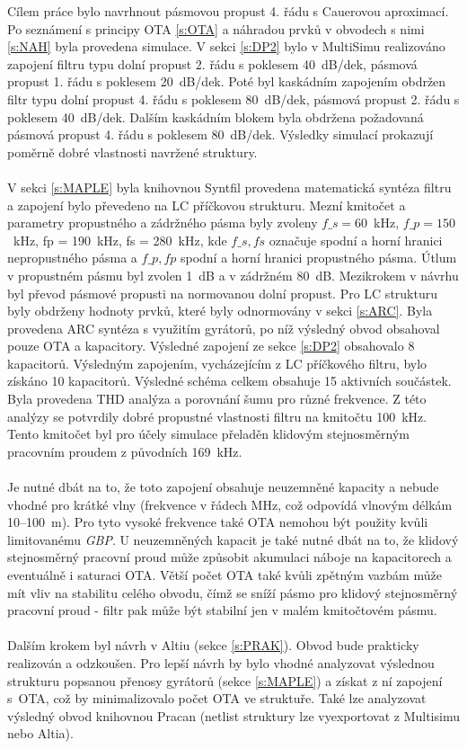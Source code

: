 \noindent Cílem práce bylo navrhnout pásmovou propust 4. řádu s Cauerovou aproximací. Po seznámení s principy OTA \ref{s:OTA} a náhradou prvků v obvodech s nimi \ref{s:NAH} byla provedena simulace. V sekci \ref{s:DP2} bylo v MultiSimu realizováno zapojení filtru typu dolní propust 2. řádu s poklesem 40~dB/dek, pásmová propust 1. řádu s poklesem 20~dB/\mbox{dek}. Poté byl kaskádním zapojením obdržen filtr typu dolní propust 4. řádu s poklesem 80~dB/dek, pásmová propust 2. řádu s poklesem 40~dB/dek. Dalším kaskádním blokem byla obdržena požadovaná pásmová propust 4. řádu s poklesem 80~dB/dek. Výsledky simulací prokazují poměrně dobré vlastnosti navržené struktury.\\
\\
V sekci \ref{s:MAPLE} byla knihovnou Syntfil provedena matematická syntéza filtru a zapojení bylo převedeno na LC příčkovou strukturu. Mezní kmitočet a parametry propustného a zádržného pásma byly zvoleny $f\_s = 60$~kHz, $f\_p = 150$~kHz, fp = 190~kHz, fs = 280~kHz, kde $f\_s, fs$ označuje spodní a horní hranici nepropustného pásma a $f\_p, fp$ spodní a horní hranici propustného pásma. Útlum v propustném pásmu byl zvolen 1~dB a v zádržném 80~dB. Mezikrokem v návrhu byl převod pásmové propusti na normovanou dolní propust. Pro LC strukturu byly obdrženy hodnoty prvků, které byly odnormovány v sekci \ref{s:ARC}. Byla provedena ARC syntéza s využitím gyrátorů, po níž výsledný obvod obsahoval pouze OTA a kapacitory. Výsledné zapojení ze sekce \ref{s:DP2} obsahovalo 8 kapacitorů. Výsledným zapojením, vycházejícím z LC příčkového filtru, bylo získáno 10 kapacitorů. Výsledné schéma celkem obsahuje 15 aktivních součástek. Byla provedena THD analýza a porovnání šumu pro různé frekvence. Z této analýzy se potvrdily dobré propustné vlastnosti filtru na kmitočtu 100~kHz. Tento kmitočet byl pro účely simulace přeladěn klidovým stejnosměrným pracovním proudem z původních 169~kHz. \\
\\
Je nutné dbát na to, že toto zapojení obsahuje neuzemněné kapacity a nebude vhodné pro krátké vlny (frekvence v řádech MHz, což odpovídá vlnovým délkám 10--100~m). Pro tyto vysoké frekvence také OTA nemohou být použity kvůli limitovanému \textit{GBP}. U neuzemněných kapacit je také nutné dbát na to, že klidový stejnosměrný pracovní proud může způsobit akumulaci náboje na kapacitorech a eventuálně i saturaci OTA. Větší počet OTA také kvůli zpětným vazbám může mít vliv na stabilitu celého obvodu, čímž se sníží pásmo pro klidový stejnosměrný pracovní proud - filtr pak může být stabilní jen v malém kmitočtovém pásmu.\\
\\
Dalším krokem byl návrh v Altiu (sekce \ref{s:PRAK}). Obvod bude prakticky realizován a odzkoušen. Pro lepší návrh by bylo vhodné analyzovat výslednou strukturu popsanou přenosy gyrátorů (sekce \ref{s:MAPLE}) a získat z ní zapojení s~OTA, což by minimalizovalo počet OTA ve struktuře. Také lze analyzovat výsledný obvod knihovnou Pracan (netlist struktury lze vyexportovat z Multisimu nebo Altia).